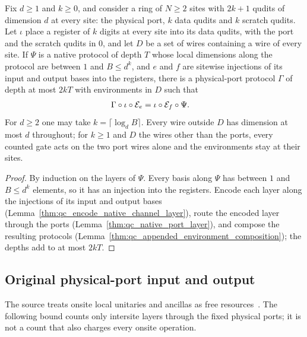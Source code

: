 \begin{lemma}
    \label{thm:qc_bounded_physical_port_simulation}
    \leanok
    Fix $d\ge1$ and $k\ge0$, and consider a ring of $N\ge2$ sites with $2k+1$ qudits of dimension
    $d$ at every site: the physical port, $k$ data qudits and $k$ scratch qudits. Let $\iota$
    place a register of $k$ digits at every site into its data qudits, with the port and the
    scratch qudits in $0$, and let $D$ be a set of wires containing a wire of every site. If
    $\Psi$ is a native protocol of depth $T$ whose local dimensions along the protocol are
    between $1$ and $B\le d^k$, and $e$ and $f$ are sitewise injections of its input and output
    bases into the registers, there is a physical-port protocol $\Gamma$ of depth at most $2kT$
    with environments in $D$ such that
    \begin{align}
        \Gamma\circ\iota\circ\mathcal E_e & =\iota\circ\mathcal E_f\circ\Psi.\notag
    \end{align}
    For $d\ge2$ one may take $k=\lceil\log_d B\rceil$. Every wire outside $D$ has dimension at
    most $d$ throughout; for $k\ge1$ and $D$ the wires other than the ports, every counted gate
    acts on the two port wires alone and the environments stay at their sites.
\end{lemma}
\begin{proof}
    \leanok
    By induction on the layers of $\Psi$. Every basis along $\Psi$ has between $1$ and
    $B\le d^k$ elements, so it has an injection into the registers. Encode each layer along the
    injections of its input and output bases
    (Lemma~\ref{thm:qc_encode_native_channel_layer}), route the encoded layer through the ports
    (Lemma~\ref{thm:qc_native_port_layer}), and compose the resulting protocols
    (Lemma~\ref{thm:qc_appended_environment_composition}); the depths add to at most $2kT$.
\end{proof}

\subsection{Original physical-port input and output}

The source treats onsite local unitaries and ancillas as free
resources~\cite[main text, p.~1]{Piroli2021LOCC}. The following bound counts
only intersite layers through the fixed physical ports; it is not a count
that also charges every onsite operation.

